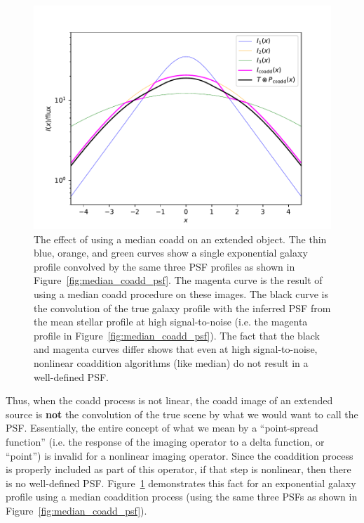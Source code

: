 \documentclass[modern]{style_and_logos/lsstdescnote}
\begin{document}
\begin{figure}
\begin{center}
\includegraphics[width=5in]{figures/extended.pdf}
 \caption{The effect of using a median coadd on an extended object. 
 The thin blue, orange, and green curves show a single exponential galaxy profile convolved by the 
 same three PSF profiles as shown in Figure~\ref{fig:median_coadd_psf}. The magenta curve is the result
 of using a median coadd procedure on these images.  The black curve is the convolution of the true
 galaxy profile with the inferred PSF from the mean stellar profile at high signal-to-noise (i.e. the magenta profile in Figure~\ref{fig:median_coadd_psf}).  The fact that the
 black and magenta curves differ shows that even at high signal-to-noise, nonlinear coaddition algorithms
 (like median) do not result in a well-defined PSF.} \label{fig:extended}
\end{center}
 \end{figure}

Thus, when the coadd process is not linear,
the coadd image of an extended source is {\bf not} the convolution of the true scene by what
we would want to call the PSF.
Essentially, the entire concept of what we mean by a ``point-spread function'' (i.e. the response
of the imaging operator to a delta function, or ``point'') is invalid for a nonlinear imaging operator.  
Since the coaddition process is properly included as part of this operator, if that
step is nonlinear, then there is no well-defined PSF. 
Figure~\ref{fig:extended} demonstrates this fact for an exponential galaxy profile using a median
coaddition process (using the same three PSFs as shown in Figure~\ref{fig:median_coadd_psf}).
\end{document}
